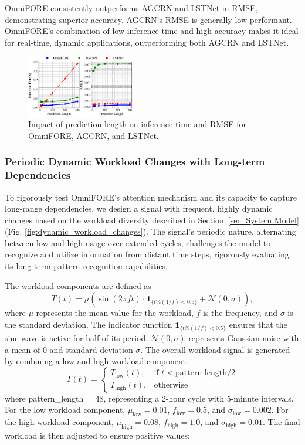 OmniFORE consistently outperforms AGCRN and LSTNet in RMSE, demonstrating superior accuracy. AGCRN's RMSE is generally low performant. OmniFORE's combination of low inference time and high accuracy makes it ideal for real-time, dynamic applications, outperforming both AGCRN and LSTNet.

\begin{figure}%
\centering
\includegraphics[width=0.42\textwidth]{img/pred_vs_inf.eps}
\caption{Impact of prediction length on inference time and RMSE for OmniFORE, AGCRN, and LSTNet.}
\label{fig:pred_vs_inf}
\end{figure}
\subsubsection{\textbf{Periodic Dynamic Workload Changes with Long-term Dependencies}}

To rigorously test OmniFORE's attention mechanism and its capacity to capture long-range dependencies, we design a signal with frequent, highly dynamic changes based on the workload diversity described in Section~\ref{sec: System Model} (Fig. \ref{fig:dynamic_workload_changes}). The signal's periodic nature, alternating between low and high usage over extended cycles, challenges the model to recognize and utilize information from distant time steps, rigorously evaluating its long-term pattern recognition capabilities.

The workload components are defined as 
\begin{equation}
T(t) = \mu \left( \sin(2\pi f t) \cdot \mathbf{1}_{\{t \% (1/f) < 0.5\}} + \mathcal{N}(0, \sigma) \right),
\end{equation}
where $\mu$ represents the mean value for the workload, $f$ is the frequency, and $\sigma$ is the standard deviation. The indicator function $\mathbf{1}_{\{t \% (1/f) < 0.5\}}$ ensures that the sine wave is active for half of its period. $\mathcal{N}(0, \sigma)$ represents Gaussian noise with a mean of 0 and standard deviation $\sigma$. The overall workload signal is generated by combining a low and high workload component:
\begin{equation}
T(t) = \begin{cases} 
T_{\text{low}}(t), & \text{if } t < \text{pattern\_length} / 2 \\
T_{\text{high}}(t), & \text{otherwise}
\end{cases}
\end{equation}
where pattern\_length = 48, representing a 2-hour cycle with 5-minute intervals.
For the low workload component, $\mu_{\text{low}} = 0.01$, $f_{\text{low}} = 0.5$, and $\sigma_{\text{low}} = 0.002$. For the high workload component, $\mu_{\text{high}} = 0.08$, $f_{\text{high}} = 1.0$, and $\sigma_{\text{high}} = 0.01$. The final workload is then adjusted to ensure positive values:


